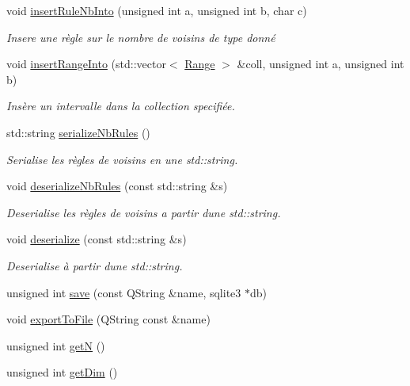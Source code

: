 \begin{DoxyCompactItemize}
void \mbox{\hyperlink{class_automaton_ad5365dca1251e866c57412b65f666ba6}{insert\+Rule\+Nb\+Into}} (unsigned int a, unsigned int b, char c)
\begin{DoxyCompactList}\small\item\em Insere une règle sur le nombre de voisins de type donné \end{DoxyCompactList}\item 
void \mbox{\hyperlink{class_automaton_a622c489cd8cc82000c3256ca0c40f48d}{insert\+Range\+Into}} (std\+::vector$<$ \mbox{\hyperlink{struct_automaton_1_1_range}{Range}} $>$ \&coll, unsigned int a, unsigned int b)
\begin{DoxyCompactList}\small\item\em Insère un intervalle dans la collection specifiée. \end{DoxyCompactList}\item 
std\+::string \mbox{\hyperlink{class_automaton_a0870a8cd719c779a822780d455e33595}{serialize\+Nb\+Rules}} ()
\begin{DoxyCompactList}\small\item\em Serialise les règles de voisins en une std\+::string. \end{DoxyCompactList}\item 
void \mbox{\hyperlink{class_automaton_a86e17f607815376791dbb2490141007d}{deserialize\+Nb\+Rules}} (const std\+::string \&s)
\begin{DoxyCompactList}\small\item\em Deserialise les règles de voisins a partir d\textquotesingle{}une std\+::string. \end{DoxyCompactList}\item 
void \mbox{\hyperlink{class_automaton_ab2a707832bdd7daf40ddf7e99503c0f9}{deserialize}} (const std\+::string \&s)
\begin{DoxyCompactList}\small\item\em Deserialise à partir d\textquotesingle{}une std\+::string. \end{DoxyCompactList}\item 
unsigned int \mbox{\hyperlink{class_automaton_a1d4431d42cc2c71fef33c125d321b633}{save}} (const Q\+String \&name, sqlite3 $\ast$db)
\item 
void \mbox{\hyperlink{class_automaton_a054e743dde571a5fdf935ce431a468a7}{export\+To\+File}} (Q\+String const \&name)
\item 
unsigned int \mbox{\hyperlink{class_automaton_af61fbe8bf05c0b2223d7a67f3e429f3e}{getN}} ()
\item 
unsigned int \mbox{\hyperlink{class_automaton_a27b050dff4898c55c20e2950e54b2fc9}{get\+Dim}} ()
\end{DoxyCompactItemize}
